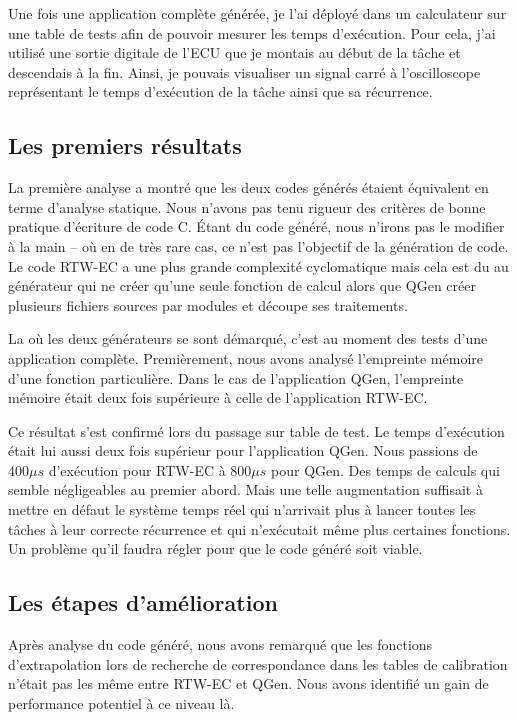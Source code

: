 Une fois une application complète générée, je l'ai déployé dans un calculateur sur une table de tests afin de pouvoir mesurer les temps d'exécution.
Pour cela, j'ai utilisé une sortie digitale de l'ECU que je montais au début de la tâche et descendais à la fin. Ainsi, je pouvais visualiser un signal carré à l'oscilloscope
représentant le temps d'exécution de la tâche ainsi que sa récurrence.

\subsection{Les premiers résultats}
La première analyse a montré que les deux codes générés étaient équivalent en terme d'analyse statique. Nous n'avons pas tenu rigueur
des critères de bonne pratique d'écriture de code C. \'Etant du code généré, nous n'irons pas le modifier à la main -- où en de
très rare cas, ce n'est pas l'objectif de la génération de code. Le code RTW-EC\up{\circledR} a une plus grande complexité cyclomatique mais cela est du au générateur
qui ne créer qu'une seule fonction de calcul alors que QGen créer plusieurs fichiers sources par modules et découpe ses traitements.

La où les deux générateurs se sont démarqué, c'est au moment des tests d'une application complète.
Premièrement, nous avons analysé l'empreinte mémoire d'une fonction particulière. Dans le cas de l'application QGen, 
l'empreinte mémoire était deux fois supérieure à celle de l'application RTW-EC\up{\circledR}.

Ce résultat s'est confirmé lors du passage sur table de test. Le temps d'exécution était lui aussi deux fois supérieur
pour l'application QGen. Nous passions de $400\mu{}s$ d'exécution pour RTW-EC\up{\circledR} à $800\mu{}s$ pour QGen.
Des temps de calculs qui semble négligeables au premier abord. Mais une telle augmentation suffisait à mettre en
défaut le système temps réel qui n'arrivait plus à lancer toutes les tâches à leur correcte récurrence et qui
n'exécutait même plus certaines fonctions. Un problème qu'il faudra régler pour que le code généré soit viable.

\subsection{Les étapes d'amélioration}
Après analyse du code généré, nous avons remarqué que les fonctions d'extrapolation lors de recherche de correspondance dans les tables de calibration
n'était pas les même entre RTW-EC\up{\circledR} et QGen. Nous avons identifié un gain de performance potentiel à ce niveau là.

